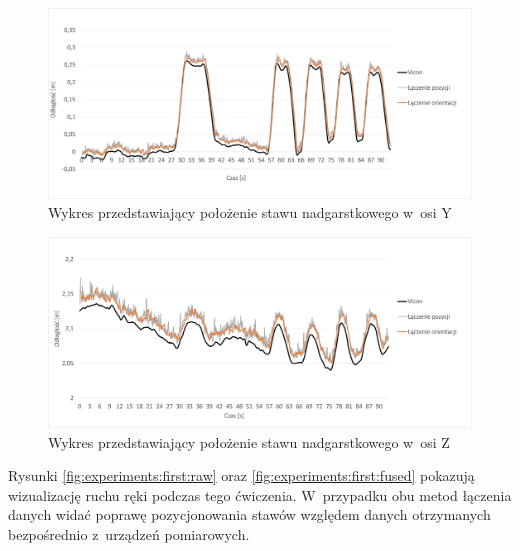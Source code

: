 \begin{figure}[!htb]
	\centering
	\includegraphics[width=0.9\linewidth]{images/100/Slide5.png}
	\caption{Wykres przedstawiający położenie stawu nadgarstkowego w~osi Y}
	\label{fig:experiments:first:wristY}
\end{figure}

\begin{figure}[!htb]
	\centering
	\includegraphics[width=0.9\linewidth]{images/100/Slide6.png}
	\caption{Wykres przedstawiający położenie stawu nadgarstkowego w~osi Z}
	\label{fig:experiments:first:wristZ}
\end{figure}

Rysunki \ref{fig:experiments:first:raw} oraz \ref{fig:experiments:first:fused} pokazują wizualizację ruchu ręki podczas tego ćwiczenia. W~przypadku obu metod łączenia danych widać poprawę pozycjonowania stawów względem danych otrzymanych bezpośrednio z~urządzeń pomiarowych. 

